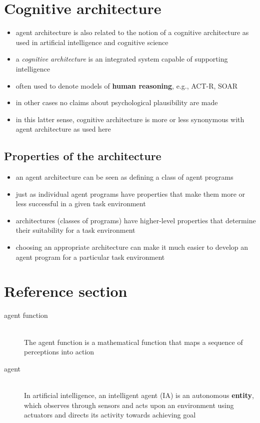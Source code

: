 \documentclass{article}
\begin{document}
\section{Cognitive architecture}

\begin{itemize}
  \item agent architecture is also related to the notion of a cognitive architecture as used in artificial intelligence and cognitive science 
  \item a \textit{cognitive architecture} is an integrated system capable of supporting intelligence 
  \item often used to denote models of \textbf{human reasoning}, e.g., ACT-R, SOAR 
  \item in other cases no claims about psychological plausibility are made 
  \item in this latter sense, cognitive architecture is more or less synonymous with agent architecture as used here
\end{itemize}

\subsection{Properties of the architecture}

\begin{itemize}
  \item an agent architecture can be seen as defining a class of agent programs 
  \item just as individual agent programs have properties that make them more or less successful in a given task environment 
  \item architectures (classes of programs) have higher-level properties that determine their suitability for a task environment 
  \item choosing an appropriate architecture can make it much easier to develop an agent program for a particular task environment
\end{itemize}

\pagebreak
\section*{Reference section} \label{sec:reference}
\begin{description}
	\item[agent function] \hfill \\ The agent function is a mathematical function that maps a sequence of perceptions into action
	\item[agent] \hfill \\ In artificial intelligence, an intelligent agent (IA) is an autonomous \textbf{entity}, which observes through sensors and acts upon an environment using actuators and directs its activity towards achieving goal
\end{description}
\end{document}
